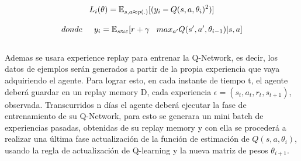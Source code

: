 \begin{equation}
L_i(\theta) = \operatorname{\mathbb{E}}_{s, a \approx p(.)}[(y_i - Q(s, a, \theta_i)^2)]
\\\\ 
\end{equation}

\begin{equation}
donde \hspace*{0.5cm}  y_i =  \operatorname{\mathbb{E}}_{s \approx \varepsilon}[r + \gamma  \hspace*{0.3cm}  max_{a'} Q(s', a', \theta_{i-1}) | s, a]
\end{equation}
\\

Ademas se usara  experience replay para entrenar la Q-Network, es decir, los datos de ejemplos serán generados a partir de la propia experiencia que vaya adquiriendo el agente. Para lograr esto, en cada instante de tiempo t, el agente deberá guardar en un replay memory D, cada experiencia $\epsilon = (s_t, a_t, r_t, s_{t+1})$, observada.
Transcurridos n días el agente deberá ejecutar la fase de entrenamiento de su Q-Network, para esto se generara un mini batch de experiencias pasadas, obtenidas de  su replay memory y con ella se procederá a realizar una última fase actualización de la función de estimación de $Q(s, a, \theta_i)$, usando la regla de actualización de Q-learning y la nueva matriz de pesos $\theta_{i+1}$.
\\\\
\\\\
\\\\
\\\\
\\\\
